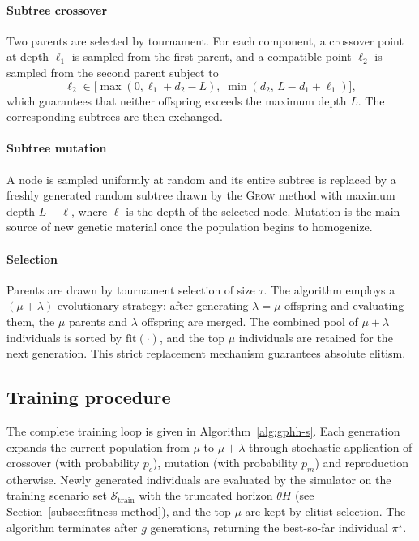 \documentclass[pdflatex]{sn-jnl}
\begin{document}
\paragraph{Subtree crossover}
Two parents are selected by tournament. For each component, a crossover
point at depth $\ell_1$ is sampled from the first parent, and a
compatible point $\ell_2$ is sampled from the second parent subject to
\begin{equation}
\ell_2\in\bigl[\max(0,\ell_1+d_2-L),\;\min(d_2,\,L-d_1+\ell_1)\bigr],
\end{equation}
which guarantees that neither offspring exceeds the maximum depth $L$.
The corresponding subtrees are then exchanged.

\paragraph{Subtree mutation}
A node is sampled uniformly at random and its entire subtree is replaced
by a freshly generated random subtree drawn by the \textsc{Grow} method
with maximum depth $L-\ell$, where $\ell$ is the depth of the selected
node. Mutation is the main source of new genetic material once the
population begins to homogenize.

\paragraph{Selection}
Parents are drawn by tournament selection of size $\tau$. The algorithm employs a $(\mu+\lambda)$ evolutionary strategy: after generating $\lambda=\mu$ offspring and evaluating them, the $\mu$ parents and $\lambda$ offspring are merged. The combined pool of $\mu+\lambda$ individuals is sorted by $\mathrm{fit}(\cdot)$, and the top $\mu$ individuals are retained for the next generation. This strict replacement mechanism guarantees absolute elitism.

\subsection{Training procedure} \label{subsec:training-method}

The complete training loop is given in Algorithm~\ref{alg:gphh-s}. Each
generation expands the current population from $\mu$ to
$\mu+\lambda$ through stochastic application of crossover (with
probability $p_c$), mutation (with probability $p_m$) and reproduction
otherwise. Newly generated individuals are evaluated by the simulator on
the training scenario set $\mathcal{S}_{\text{train}}$ with the truncated
horizon $\theta H$ (see Section~\ref{subsec:fitness-method}), and the top $\mu$
are kept by elitist selection. The algorithm terminates after $g$ generations,
returning the best-so-far individual $\pi^\star$.
\end{document}
